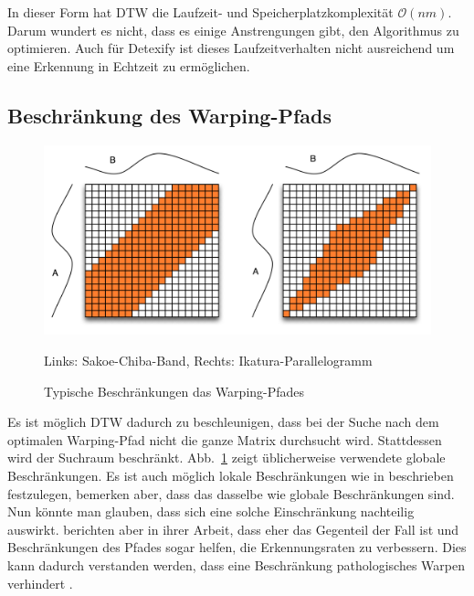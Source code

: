 
In dieser Form hat DTW die Laufzeit- und Speicherplatzkomplexität \(\mathcal{O}(nm)\). Darum wundert es nicht, dass es einige Anstrengungen gibt, den Algorithmus zu optimieren. Auch für Detexify ist dieses Laufzeitverhalten nicht ausreichend um eine Erkennung in Echtzeit zu ermöglichen.


\subsection{Beschränkung des Warping-Pfads} %
\label{sub:constrained_warping_window}

\begin{figure}
  \centering \includegraphics[width=\textwidth]{figures/constraints.png}
  \caption{Typische Beschränkungen das Warping-Pfades}
   Links: Sakoe-Chiba-Band, Rechts: Ikatura-Parallelogramm
  \label{fig:constraints}
\end{figure}


Es ist möglich DTW dadurch zu beschleunigen, dass bei der Suche nach dem optimalen Warping-Pfad nicht die ganze Matrix durchsucht wird. Stattdessen wird der Suchraum beschränkt. Abb.~\ref{fig:constraints} zeigt üblicherweise verwendete globale Beschränkungen. Es ist auch möglich lokale Beschränkungen wie in \cite{Rabiner:1993p11752} beschrieben festzulegen, \citet{Keogh:2005p7751} bemerken aber, dass das dasselbe wie globale Beschränkungen sind. Nun könnte man glauben, dass sich eine solche Einschränkung nachteilig auswirkt. \citet{Ratanamahatana:2004p7522} berichten aber in ihrer Arbeit, dass eher das Gegenteil der Fall ist und Beschränkungen des Pfades sogar helfen, die Erkennungsraten zu verbessern. Dies kann dadurch verstanden werden, dass eine Beschränkung pathologisches Warpen verhindert \cite{Keogh:2005p7751}.

